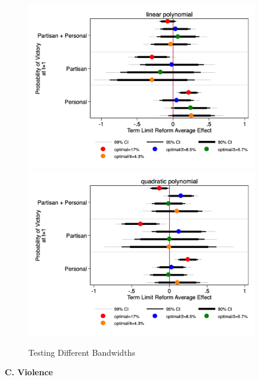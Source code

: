 \documentclass[12pt]{amsart}
\numberwithin{equation}{section}
\theoremstyle{definition}
\theoremstyle{definition}
\theoremstyle{definition}
\begin{document}
 \begin{figure}[H]   
\centering
 \caption{Testing Different Bandwidths}
 \label{fig:parallel_trend}
\includegraphics[width=0.9\textwidth]{../Figures/many_bandwidths_linear.png}
       \captionsetup{justification=centering}
 \includegraphics[width=0.9\textwidth]{../Figures/many_bandwidths_quadratic.png}

   
\end{figure} 

\clearpage 

\textbf{C. Violence}

      
   
\end{document}
